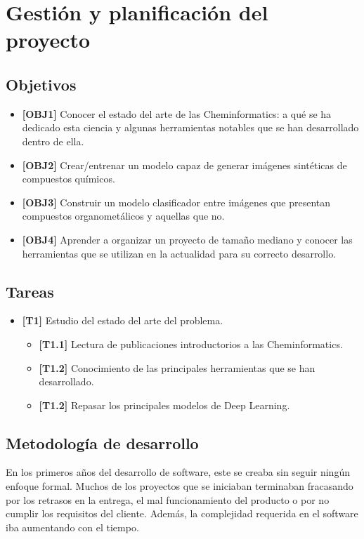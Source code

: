 \chapter{Gestión y planificación del proyecto}

\section{Objetivos}

\begin{itemize}
    \item \textbf{[OBJ1]} Conocer el estado del arte de las Cheminformatics: a qué se ha dedicado esta ciencia y algunas herramientas notables que se han desarrollado dentro de ella.
    \item \textbf{[OBJ2]} Crear/entrenar un modelo capaz de generar imágenes sintéticas de compuestos químicos.
    \item \textbf{[OBJ3]} Construir un modelo clasificador entre imágenes que presentan compuestos organometálicos y aquellas que no.
    \item \textbf{[OBJ4]} Aprender a organizar un proyecto de tamaño mediano y conocer las herramientas que se utilizan en la actualidad para su correcto desarrollo.
\end{itemize}

\section{Tareas}
\begin{itemize}
    \item \textbf{[T1]} Estudio del estado del arte del problema.
    \begin{itemize}
        \item \textbf{[T1.1]} Lectura de publicaciones introductorios a las Cheminformatics.  
        \item \textbf{[T1.2]} Conocimiento de las principales herramientas que se han desarrollado.
        \item \textbf{[T1.2]} Repasar los principales modelos de Deep Learning.
    \end{itemize}
\end{itemize}

\section{Metodología de desarrollo}

En los primeros años del desarrollo de software, este se creaba sin seguir ningún enfoque formal. Muchos de los proyectos que se iniciaban terminaban fracasando por los retrasos en la entrega, el mal funcionamiento del producto o por no cumplir los requisitos del cliente. Además, la complejidad requerida en el software iba aumentando con el tiempo. 

